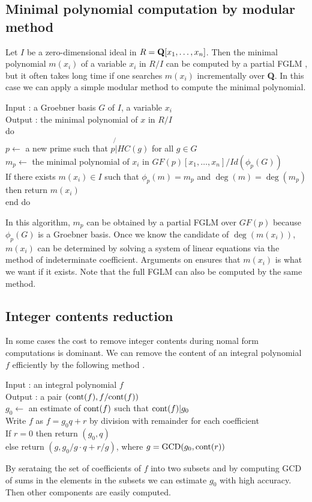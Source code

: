\documentclass[runningheads]{cl2emult}
\def\cont{{\rm cont}}
\def\GCD{{\rm GCD}}
\begin{document}
\subsection{Minimal polynomial computation by modular method}
Let $I$ be a zero-dimensional ideal in $R={\bf Q}[x_1,\ldots,x_n]$.
Then the minimal polynomial $m(x_i)$ of a variable $x_i$ in $R/I$ can
be computed by a partial FGLM \cite{FGLM}, but it often takes long
time if one searches $m(x_i)$ incrementally over {\bf Q}.  In this
case we can apply a simple modular method to compute the minimal
polynomial.
\begin{tabbing}
Input : a Groebner basis $G$ of $I$, a variable $x_i$\\
Output : the minimal polynomial of $x$ in $R/I$\\
do \= \\
\> $p \leftarrow$ a new prime such that $p \not{|} HC(g)$ for all $g \in G$\\
\> $m_p \leftarrow$ the minimal polynomial of $x_i$ in $GF(p)[x_1,\ldots,x_n]/Id(\phi_p(G))$\\
\> If there exists $m(x_i) \in I$ such that $\phi_p(m) = m_p$ and $\deg(m)=\deg(m_p)$\\
\> then return $m(x_i)$\\
end do
\end{tabbing}
In this algorithm, $m_p$ can be obtained by a partial FGLM over
$GF(p)$ because $\phi_p(G)$ is a Groebner basis. Once we know the
candidate of $\deg(m(x_i))$, $m(x_i)$ can be determined by solving a
system of linear equations via the method of indeterminate
coefficient. Arguments on \cite{NOYO} ensures that $m(x_i)$ is what we
want if it exists. Note that the full FGLM can also be computed by the
same method.

\subsection{Integer contents reduction}

In some cases the cost to remove integer contents during nomal form
computations is dominant. We can remove the content of an integral
polynomial $f$ efficiently by the following method \cite{REPL}.
\begin{tabbing}
Input : an integral polynomial $f$\\
Output : a pair $(\cont(f),f/\cont(f))$\\
$g_0 \leftarrow$ an estimate of $\cont(f)$ such that $\cont(f)|g_0$\\
Write $f$ as $f = g_0q+r$ by division with remainder for each coefficient\\
If $r = 0$ then return $(g_0,q)$\\
else return $(g,g_0/g \cdot q + r/g)$, where $g = \GCD(g_0,\cont(r))$
\end{tabbing}
By serataing the set of coefficients of $f$ into two subsets and by
computing GCD of sums in the elements in the subsets we can estimate
$g_0$ with high accuracy. Then other components are easily computed.
\end{document}

